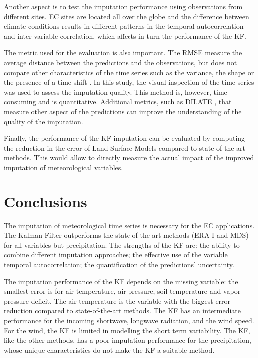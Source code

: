 \documentclass{article}
\let\Oldsection\section
\renewcommand{\section}{\FloatBarrier\Oldsection}
\begin{document}
Another aspect is to test the imputation performance using observations from different sites. EC sites are located all over the globe \cite{pastorello_fluxnet2015_2020} and the difference between climate conditions results in different patterns in the temporal autocorrelation and inter-variable correlation, which affects in turn the performance of the KF.

The metric used for the evaluation is also important. The RMSE measure the average distance between the predictions and the observations, but does not compare other characteristics of the time series such as the variance, the shape or the presence of a time-shift \cite{guen_shape_nodate}. In this study, the visual inspection of the time series was used to assess the imputation quality. This method is, however, time-consuming and is quantitative. Additional metrics, such as DILATE \cite{guen_shape_nodate}, that measure other aspect of the predictions can improve the understanding of the quality of the imputation.

Finally, the performance of the KF imputation can be evaluated by computing the reduction in the error of Land Surface Models compared to state-of-the-art methods. This would allow to directly measure the actual impact of the improved imputation of meteorological variables. 


\section{Conclusions}

The imputation of meteorological time series is necessary for the EC applications. The Kalman Filter outperforms the state-of-the-art methods (ERA-I and MDS) for all variables but precipitation. The strengths of the KF are: the ability to combine different imputation approaches; the effective use of the variable temporal autocorrelation; the quantification of the predictions' uncertainty. 

The imputation performance of the KF depends on the missing variable: the smallest error is for air temperature, air pressure, soil temperature and vapor pressure deficit. The air temperature is the variable with the biggest error reduction compared to state-of-the-art methods. The KF has an intermediate performance for the incoming shortwave, longwave radiation, and the wind speed. For the wind, the KF is limited in modelling the short term variability. The KF, like the other methods, has a poor imputation performance for the precipitation, whose unique characteristics do not make the KF a suitable method.
\end{document}
